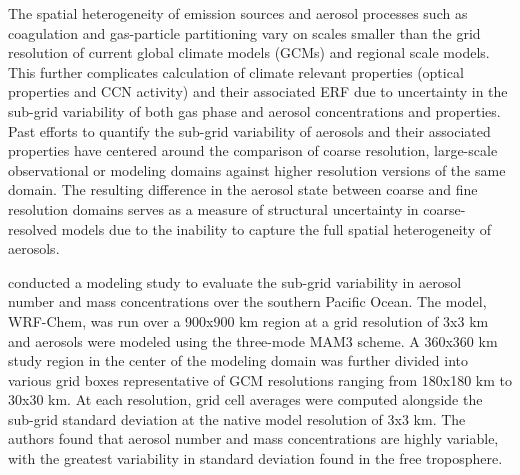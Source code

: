 The spatial heterogeneity of emission sources and aerosol processes such as coagulation and gas-particle partitioning vary on scales smaller than the grid resolution of current global climate models (GCMs) and regional scale models. This further complicates calculation of climate relevant properties  (optical properties and CCN activity) and their associated ERF due to uncertainty in the sub-grid variability of both gas phase and aerosol concentrations and properties. Past efforts to quantify the sub-grid variability of aerosols and their associated properties have centered around the comparison of coarse resolution, large-scale observational or modeling domains against higher resolution versions of the same domain. The resulting difference in the aerosol state between coarse and fine resolution domains serves as a measure of structural uncertainty in coarse-resolved models due to the inability to capture the full spatial heterogeneity of aerosols. 

\cite{lin_quantification_2017} conducted a modeling study to evaluate the sub-grid variability in aerosol number and mass concentrations over the southern Pacific Ocean. The model, WRF-Chem, was run over a 900x900 km region at a grid resolution of 3x3 km and aerosols were modeled using the three-mode MAM3 scheme. A 360x360 km study region in the center of the modeling domain was further divided into various grid boxes representative of GCM resolutions ranging from 180x180 km to 30x30 km. At each resolution, grid cell averages were computed alongside the sub-grid standard deviation at the native model resolution of 3x3 km. The authors found that aerosol number and mass concentrations are highly variable, with the greatest variability in standard deviation found in the free troposphere. 

